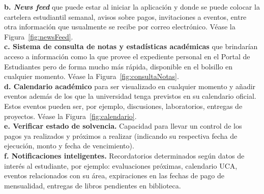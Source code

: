 \documentclass[12pt]{article}
\begin{document}
\textbf{b. \textit{News feed}} que puede estar al iniciar la aplicación y donde se puede colocar la cartelera estudiantil semanal, avisos sobre pagos, invitaciones a eventos, entre otra información que usualmente se recibe por correo electrónico. Véase la Figura~\ref{fig:newsFeed}.\\

\textbf{c. Sistema de consulta de notas y estadísticas académicas } que brindarían acceso a información como la que provee el expediente personal en el Portal de Estudiantes pero de forma mucho más rápida, disponible en el bolsillo en cualquier momento. Véase la Figura~\ref{fig:consultaNotas}.\\


\textbf{d. Calendario académico} para ser visualizado en cualquier momento y añadir eventos además de los que la universidad tenga previstos en su calendario oficial. Estos eventos pueden ser, por ejemplo, discusiones, laboratorios, entregas de proyectos. Véase la Figura~\ref{fig:calendario}.\\

\textbf{e. Verificar estado de solvencia. } Capacidad para llevar un control de los pagos ya realizados y pr\'oximos a realizar (indicando su respectiva fecha de ejecuci\'on, monto y fecha de vencimiento).\\

\textbf{f. Notificaciones inteligentes. }Recordatorios determinados seg\'un  datos de inter\'es al estudiante, por ejemplo: evaluaciones pr\'oximas, calendario UCA, eventos relacionados con su \'area, expiraciones en las fechas de pago de mensualidad, entregas de libros pendientes en biblioteca.\\
\end{document}
